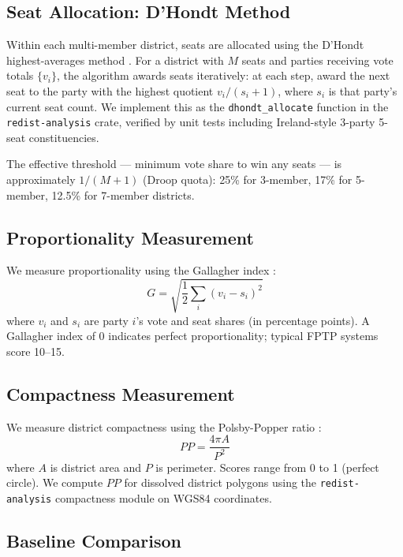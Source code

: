 \subsection{Seat Allocation: D'Hondt Method}

Within each multi-member district, seats are allocated using the D'Hondt highest-averages method \citep{dhondt1882}. For a district with $M$ seats and parties receiving vote totals $\{v_i\}$, the algorithm awards seats iteratively: at each step, award the next seat to the party with the highest quotient $v_i / (s_i + 1)$, where $s_i$ is that party's current seat count. We implement this as the \texttt{dhondt\_allocate} function in the \texttt{redist-analysis} crate, verified by unit tests including Ireland-style 3-party 5-seat constituencies.

The effective threshold --- minimum vote share to win any seats --- is approximately $1/(M+1)$ (Droop quota): 25\% for 3-member, 17\% for 5-member, 12.5\% for 7-member districts.

\subsection{Proportionality Measurement}

We measure proportionality using the Gallagher index \citep{gallagher1991proportionality}:
\begin{equation}
    G = \sqrt{\frac{1}{2} \sum_i (v_i - s_i)^2}
\end{equation}
where $v_i$ and $s_i$ are party $i$'s vote and seat shares (in percentage points). A Gallagher index of 0 indicates perfect proportionality; typical FPTP systems score 10--15.

\subsection{Compactness Measurement}

We measure district compactness using the Polsby-Popper ratio \citep{polsby1991third}:
\begin{equation}
    PP = \frac{4\pi A}{P^2}
\end{equation}
where $A$ is district area and $P$ is perimeter. Scores range from 0 to 1 (perfect circle). We compute $PP$ for dissolved district polygons using the \texttt{redist-analysis} compactness module on WGS84 coordinates.

\subsection{Baseline Comparison}

